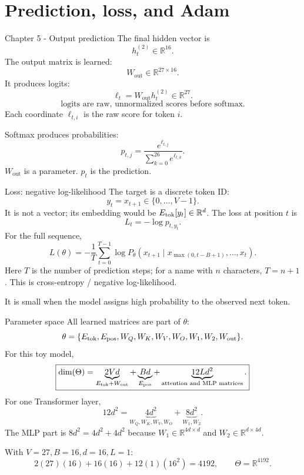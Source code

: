 \documentclass[
  xcolor={svgnames,dvipsnames},
  hyperref={pagebackref,bookmarks},
  aspectratio=169,
  11pt
]{beamer}
\begin{document}
\section{Prediction, loss, and Adam}
\begin{frame}{Chapter 5 - Output prediction}
The final hidden vector is
\[
h_t^{(2)}\in\mathbb R^{16}.
\]
The output matrix is learned:
\[
W_{\mathrm{out}}\in\mathbb R^{27\times16}.
\]
It produces logits:
\[
\ell_t=W_{\mathrm{out}}h_t^{(2)}\in\mathbb R^{27}.
\]
\[
\boxed{\text{logits are raw, unnormalized scores before softmax.}}
\]
Each coordinate $\ell_{t,i}$ is the raw score for token $i$.

Softmax produces probabilities:
\[
p_{t,j}=\frac{e^{\ell_{t,j}}}{\sum_{k=0}^{26}e^{\ell_{t,k}}}.
\]
$W_{\mathrm{out}}$ is a parameter. $p_t$ is the prediction.
\end{frame}

\begin{frame}{Loss: negative log-likelihood}
The target is a discrete token ID:
\[
\boxed{y_t=x_{t+1}\in\{0,\ldots,V-1\}.}
\]
It is not a vector; its embedding would be $E_{\rm tok}[y_t]\in\mathbb R^d$.
The loss at position $t$ is
\[
L_t=-\log p_{t,y_t}.
\]
For the full sequence,
\[
L(\theta)=-\frac{1}{T}\sum_{t=0}^{T-1}\log P_\theta\!\left(x_{t+1}\mid x_{\max(0,t-B+1)},\ldots,x_t\right).
\]
Here $T$ is the number of prediction steps; for a name with $n$ characters, $T=n+1$.
This is cross-entropy / negative log-likelihood.

\vspace{0.3cm}
It is small when the model assigns high probability to the observed next token.
\end{frame}

\begin{frame}{Parameter space}
All learned matrices are part of $\theta$:
\[
\theta=\{E_{\rm tok},E_{\rm pos},W_Q,W_K,W_V,W_O,W_1,W_2,W_{\rm out}\}.
\]
For this toy model,
\[
\boxed{\dim(\Theta)=\underbrace{2Vd}_{E_{\rm tok}+W_{\rm out}}+\underbrace{Bd}_{E_{\rm pos}}+\underbrace{12Ld^2}_{\text{attention and MLP matrices}}.}
\]
For one Transformer layer,
\[
\boxed{12d^2=\underbrace{4d^2}_{W_Q,W_K,W_V,W_O}+\underbrace{8d^2}_{W_1,W_2}.}
\]
The MLP part is $8d^2=4d^2+4d^2$ because $W_1\in\mathbb R^{4d\times d}$ and $W_2\in\mathbb R^{d\times4d}$.

With $V=27, B=16, d=16, L=1$:
\[
2(27)(16)+16(16)+12(1)(16^2)=4192,
\qquad \Theta=\mathbb R^{4192}.
\]
\end{frame}
\end{document}
